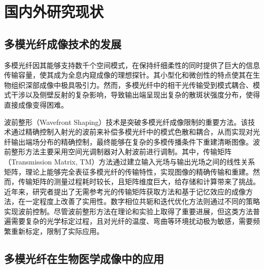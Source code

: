 {\section{国内外研究现状}\label{sec:relatedwork}

\subsection{多模光纤成像技术的发展}

多模光纤因其能够支持数千个空间模式，在保持纤细柔性的同时提供了巨大的信息传输容量，使其成为全息内窥成像的理想探针\citep{conkey2012high,bianchi2012multi,cizmar2012exploiting,papadopoulos2013high,张持铭2025基于光场调控的多模光纤成像技术及应用,程圣福2024基于相干光调控的无透镜光纤成像及其应用}。其小型化和微创性的特点使其在生物组织深部成像中极具吸引力\citep{wen2023single,stiburek2023110,ohayon2018minimally,vasquez2018subcellular,turtaev2018high}。然而，多模光纤中的相干光传输受到模式耦合、模式干涉以及侧壁反射的复杂影响，导致输出端呈现出复杂的散斑状强度分布，使得直接成像变得困难。

波前整形（Wavefront Shaping）技术是突破多模光纤成像限制的重要方法\citep{vellekoop2007focusing}。该技术通过精确控制入射光的波前来补偿多模光纤中的模式色散和耦合，从而实现对光纤输出端场分布的精确控制，最终能够在复杂的多模传播条件下重建清晰图像。波前整形方法主要采用空间光调制器对入射波前进行调制。其中，传输矩阵（Transmission Matrix, TM）方法\citep{cizmar2011shaping,ploschner2015seeing}通过建立输入光场与输出光场之间的线性关系矩阵，理论上能够完全表征多模光纤的传输特性，实现图像的精确传输和重建。然而，传输矩阵的测量过程耗时较长，且矩阵维度巨大，给存储和计算带来了挑战。近年来，研究者提出了无需参考光的传输矩阵获取方法\citep{zhong2023efficient}和基于记忆效应的成像方法\citep{li2021memory}，在一定程度上改善了实用性。数字相位共轭\citep{papadopoulos2012focusing,czarske2016transmission}和迭代优化方法\citep{wang2025real,zhong2023efficient,yao2025efficient}则通过不同的策略实现波前控制。尽管波前整形方法在理论和实验上取得了重要进展，但这类方法普遍需要复杂的光学标定过程，且对光纤的温度、弯曲等环境扰动极为敏感，需要频繁重新标定，限制了实际应用。


\subsection{多模光纤在生物医学成像中的应用}

}
